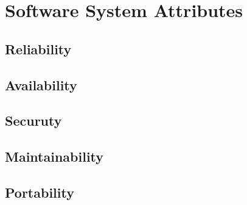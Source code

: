 \section{Software System Attributes}
\subsection{Reliability}
\subsection{Availability}
\subsection{Securuty}
\subsection{Maintainability}
\subsection{Portability}